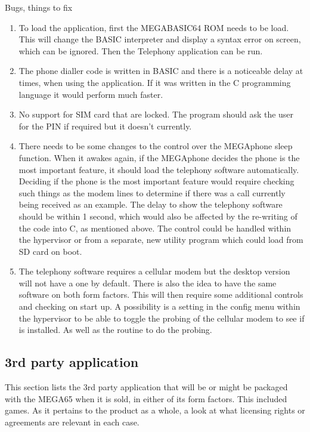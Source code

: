 Bugs, things to fix
\begin{enumerate}
\item To load the application, first the MEGABASIC64 ROM needs to be load. This will change the BASIC interpreter and display a syntax error on screen, which can be ignored. Then the Telephony application can be run.
\item The phone dialler code is written in BASIC and there is a noticeable delay at times, when using the application. If it was written in the C programming language it would perform much faster.
\item No support for SIM card that are locked. The program should ask the user for the PIN if required but it doesn't currently.
\item There needs to be some changes to the control over the MEGAphone sleep function. When it awakes again, if the MEGAphone decides the phone is the most important feature, it should load the telephony software automatically. Deciding if the phone is the most important feature would require checking such things as the modem lines to determine if there was a call currently being received as an example. The delay to show the telephony software should be within 1 second, which would also be affected by the re-writing of the code into C, as mentioned above. The control could be handled within the hypervisor or from a separate, new utility program which could load from SD card on boot.
\item The telephony software requires a cellular modem but the desktop version will not have a one by default. There is also the idea to have the same software on both form factors. This will then require some additional controls and checking on start up. A possibility is a setting in the config menu within the hypervisor to be able to toggle the probing of the cellular modem to see if is installed. As well as the routine to do the probing.
\end{enumerate}



 	

\subsection{3rd party application}
This section lists the 3rd party application that will be or might be packaged with the MEGA65 when it is sold, in either of its form factors. This included games. As it pertains to the product as a whole, a look at what licensing rights or agreements are relevant in each case.



